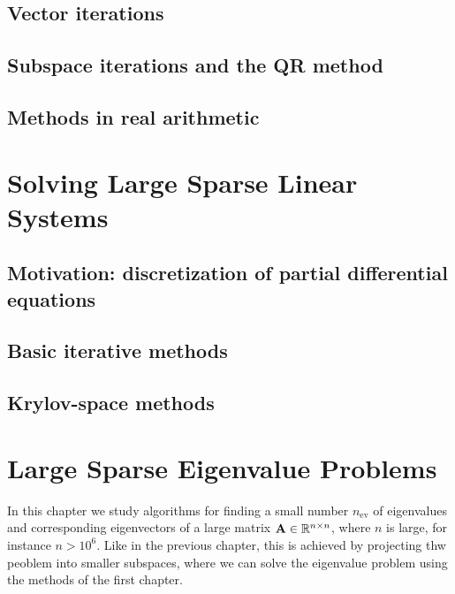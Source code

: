 \section{Vector iterations}


\section{Subspace iterations and the QR method}


\section{Methods in real arithmetic}


%

\chapter{Solving Large Sparse Linear Systems}

\section{Motivation: discretization of partial differential equations}



\section{Basic iterative methods}


\section{Krylov-space methods}


\chapter{Large Sparse Eigenvalue Problems}

\begin{intro}
  In this chapter we study algorithms for finding a small number
  $n_{\text{ev}}$ of eigenvalues and corresponding eigenvectors of a
  large matrix $\mathbf A\in\mathbb R^{n\times n}$, where $n$ is large, for instance
  $n>10^6$. Like in the previous chapter, this is achieved by
  projecting thw peoblem into smaller subspaces, where we can solve
  the eigenvalue problem using the methods of the first chapter.
\end{intro}

